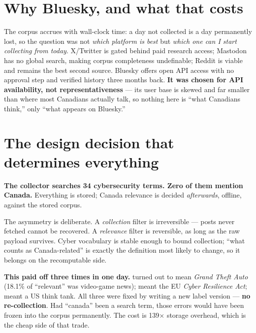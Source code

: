 \documentclass[10pt]{article}
\begin{document}
\section{Why Bluesky, and what that costs}

The corpus accrues with wall-clock time: a day not collected is a day
permanently lost, so the question was not \emph{which platform is best} but
\emph{which one can I start collecting from today}. X/Twitter is gated behind
paid research access; Mastodon has no global search, making corpus completeness
undefinable; Reddit is viable and remains the best second source. Bluesky offers
open API access with no approval step and verified history three months back.
\textbf{It was chosen for API availability, not representativeness} --- its user
base is skewed and far smaller than where most Canadians actually talk, so
nothing here is ``what Canadians think,'' only ``what appears on Bluesky.''

\section{The design decision that determines everything}

\begin{keybox}
\textbf{The collector searches 34 cybersecurity terms. Zero of them mention
Canada.} Everything is stored; Canada relevance is decided \emph{afterwards},
offline, against the stored corpus.
\end{keybox}

The asymmetry is deliberate. A \emph{collection} filter is irreversible --- posts
never fetched cannot be recovered. A \emph{relevance} filter is reversible, as
long as the raw payload survives. Cyber vocabulary is stable enough to bound
collection; ``what counts as Canada-related'' is exactly the definition most
likely to change, so it belongs on the recomputable side.

\textbf{This paid off three times in one day.}  turned out to mean
\emph{Grand Theft Auto} (18.1\% of ``relevant'' was video-game news);
 meant the EU \emph{Cyber Resilience Act};  meant a US
think tank. All three were fixed by writing a new label version --- \textbf{no
re-collection}. Had ``canada'' been a search term, those errors would have been
frozen into the corpus permanently. The cost is 139$\times$ storage overhead,
which is the cheap side of that trade.
\end{document}
